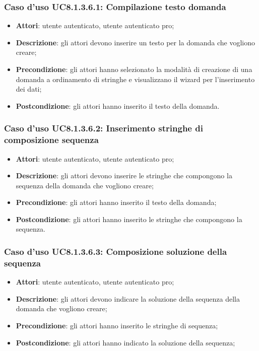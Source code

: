 \subsubsection{Caso d'uso UC8.1.3.6.1: Compilazione testo domanda}
	\begin{itemize}
		\item \textbf{Attori}: utente autenticato, utente autenticato pro;
		\item \textbf{Descrizione}: gli attori devono inserire un testo per la domanda che vogliono creare;
		\item \textbf{Precondizione}: gli attori hanno selezionato la modalità di creazione di una domanda a ordinamento di stringhe e visualizzano il wizard per l'inserimento dei dati;
		\item \textbf{Postcondizione}: gli attori hanno inserito il testo della domanda.
	\end{itemize}
	
\subsubsection{Caso d'uso UC8.1.3.6.2: Inserimento stringhe di composizione sequenza}
	\begin{itemize}
		\item \textbf{Attori}: utente autenticato, utente autenticato pro;
		\item \textbf{Descrizione}: gli attori devono inserire le stringhe che compongono la sequenza della domanda che vogliono creare;
		\item \textbf{Precondizione}: gli attori hanno inserito il testo della domanda;
		\item \textbf{Postcondizione}: gli attori hanno inserito le stringhe che compongono la sequenza.
	\end{itemize}
	
\subsubsection{Caso d'uso UC8.1.3.6.3: Composizione soluzione della sequenza}
	\begin{itemize}
		\item \textbf{Attori}: utente autenticato, utente autenticato pro;
		\item \textbf{Descrizione}: gli attori devono indicare la soluzione della sequenza della domanda che vogliono creare;
		\item \textbf{Precondizione}: gli attori hanno inserito le stringhe di sequenza;
		\item \textbf{Postcondizione}: gli attori hanno indicato la soluzione della sequenza; 
	\end{itemize}